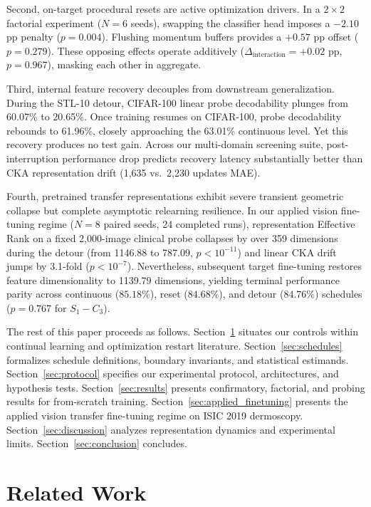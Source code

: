 \documentclass[sn-mathphys,Numbered]{sn-jnl}
\begin{document}
Second, on-target procedural resets are active optimization drivers. In a $2 \times 2$ factorial experiment ($N = 6$ seeds), swapping the classifier head imposes a $-2.10$ pp penalty ($p = 0.004$). Flushing momentum buffers provides a $+0.57$ pp offset ($p = 0.279$). These opposing effects operate additively ($\Delta_{\mathrm{interaction}} = +0.02$ pp, $p = 0.967$), masking each other in aggregate.

Third, internal feature recovery decouples from downstream generalization. During the STL-10 detour, CIFAR-100 linear probe decodability plunges from 60.07\% to 20.65\%. Once training resumes on CIFAR-100, probe decodability rebounds to 61.96\%, closely approaching the 63.01\% continuous level. Yet this recovery produces no test gain. Across our multi-domain screening suite, post-interruption performance drop predicts recovery latency substantially better than CKA representation drift (1,635 vs.\ 2,230 updates MAE).

Fourth, pretrained transfer representations exhibit severe transient geometric collapse but complete asymptotic relearning resilience. In our applied vision fine-tuning regime ($N = 8$ paired seeds, 24 completed runs), representation Effective Rank on a fixed 2,000-image clinical probe collapses by over 359 dimensions during the detour (from 1146.88 to 787.09, $p < 10^{-11}$) and linear CKA drift jumps by 3.1-fold ($p < 10^{-7}$). Nevertheless, subsequent target fine-tuning restores feature dimensionality to 1139.79 dimensions, yielding terminal performance parity across continuous ($85.18\%$), reset ($84.68\%$), and detour ($84.76\%$) schedules ($p = 0.767$ for $S_1 - C_3$).

The rest of this paper proceeds as follows. Section~\ref{sec:related_work} situates our controls within continual learning and optimization restart literature. Section~\ref{sec:schedules} formalizes schedule definitions, boundary invariants, and statistical estimands. Section~\ref{sec:protocol} specifies our experimental protocol, architectures, and hypothesis tests. Section~\ref{sec:results} presents confirmatory, factorial, and probing results for from-scratch training. Section~\ref{sec:applied_finetuning} presents the applied vision transfer fine-tuning regime on ISIC 2019 dermoscopy. Section~\ref{sec:discussion} analyzes representation dynamics and experimental limits. Section~\ref{sec:conclusion} concludes.

\section{Related Work}\label{sec:related_work}
\end{document}
